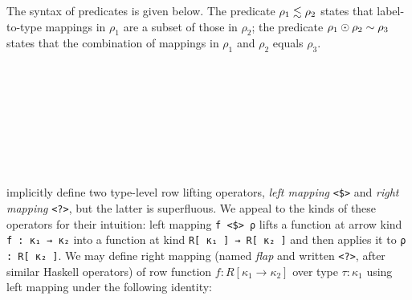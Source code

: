\documentclass[authoryear, acmsmall, screen, review, nonacm]{acmart}
\begin{document}
The syntax of predicates is given below. The predicate $\LeqP {\rho_1} {\rho_2}$ states that label-to-type mappings in $\rho_1$ are a subset of those in $\rho_2$; the predicate $\rho_1 \odot \rho_2 \sim \rho_3$ states that the combination of mappings in $\rho_1$ and $\rho_2$ equals $\rho_3$.

\begin{code}%
\>[0]\AgdaSpace{}%
\AgdaSpace{}%
\AgdaSpace{}%
\<%
\\
\>[0][@{}l@{\AgdaIndent{0}}]%
\>[2]\AgdaSpace{}%
\AgdaSymbol{:}\<%
\\
\>[2][@{}l@{\AgdaIndent{0}}]%
\>[4]\AgdaSymbol{(}\AgdaSpace{}%
\AgdaSpace{}%
\AgdaSpace{}%
\AgdaSymbol{:}\AgdaSpace{}%
\AgdaSpace{}%
\AgdaSpace{}%
\AgdaOperator{\AgdaInductiveConstructor{R[}}\AgdaSpace{}%
\AgdaSpace{}%
\AgdaOperator{\AgdaInductiveConstructor{]}}\AgdaSymbol{)}\AgdaSpace{}%
\<%
\\
%
\>[4]\AgdaSpace{}%
\AgdaSpace{}%
\AgdaOperator{\AgdaInductiveConstructor{R[}}\AgdaSpace{}%
\AgdaSpace{}%
\AgdaOperator{\AgdaInductiveConstructor{]}}\<%
\\
%
\\[\AgdaEmptyExtraSkip]%
%
\>[2]\AgdaSpace{}%
\AgdaSymbol{:}\<%
\\
\>[2][@{}l@{\AgdaIndent{0}}]%
\>[4]\AgdaSymbol{(}\AgdaSpace{}%
\AgdaSpace{}%
\AgdaSymbol{:}\AgdaSpace{}%
\AgdaSpace{}%
\AgdaSpace{}%
\AgdaOperator{\AgdaInductiveConstructor{R[}}\AgdaSpace{}%
\AgdaSpace{}%
\AgdaOperator{\AgdaInductiveConstructor{]}}\AgdaSymbol{)}\AgdaSpace{}%
\<%
\\
%
\>[4]\AgdaSpace{}%
\AgdaSpace{}%
\AgdaOperator{\AgdaInductiveConstructor{R[}}\AgdaSpace{}%
\AgdaSpace{}%
\AgdaOperator{\AgdaInductiveConstructor{]}}\<%
\end{code}

\citet{HubersM23} implicitly define two type-level row lifting operators, \emph{left mapping} \verb!<$>! and \emph{right mapping} \verb!<?>!, but the latter is superfluous. We appeal to the kinds of these operators for their intuition: left mapping \verb!f <$> ρ! lifts a function at arrow kind \verb!f : κ₁ → κ₂! into a function at kind \verb!R[ κ₁ ] → R[ κ₂ ]! and then applies it to \verb!ρ : R[ κ₂ ]!. We may define right mapping (named \emph{flap} and written \verb!<?>!, after similar Haskell operators) of row function $f : R[ \kappa_1 \to \kappa_2 ]$ over type $\tau : \kappa_1$ using left mapping under the following identity:
\end{document}
